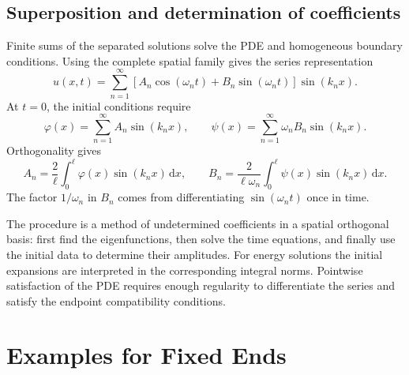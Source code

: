 \documentclass[11pt,a4paper]{article}
\newcommand{\dd}{\,\mathrm{d}}
\begin{document}
\subsection{Superposition and determination of coefficients}
Finite sums of the separated solutions solve the PDE and homogeneous boundary
conditions. Using the complete spatial family gives the series representation
\begin{equation}\label{eq:fixedseries}
 u(x,t)=\sum_{n=1}^\infty
       [A_n\cos(\omega_nt)+B_n\sin(\omega_nt)]\sin(k_nx).
\end{equation}
At $t=0$, the initial conditions require
\begin{equation}
 \varphi(x)=\sum_{n=1}^\infty A_n\sin(k_nx),\qquad
 \psi(x)=\sum_{n=1}^\infty\omega_nB_n\sin(k_nx).
\end{equation}
Orthogonality gives
\begin{equation}\label{eq:fixedcoefficients}
 \boxed{A_n=\frac2\ell\int_0^\ell\varphi(x)\sin(k_nx)\dd x,\qquad
 B_n=\frac2{\ell\omega_n}\int_0^\ell\psi(x)\sin(k_nx)\dd x.}
\end{equation}
The factor $1/\omega_n$ in $B_n$ comes from differentiating
$\sin(\omega_nt)$ once in time.

The procedure is a method of undetermined coefficients in a spatial orthogonal
basis: first find the eigenfunctions, then solve the time equations, and finally
use the initial data to determine their amplitudes.
For energy solutions the initial expansions are interpreted in the corresponding
integral norms. Pointwise satisfaction of the PDE requires enough regularity to
differentiate the series and satisfy the endpoint compatibility conditions.

\section{Examples for Fixed Ends}
\end{document}
